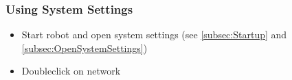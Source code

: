 \documentclass{article}
\begin{document}
\subsubsection{Using System Settings}
\begin{itemize}
\item Start robot and open system settings (see \ref{subsec:Startup} and \ref{subsec:OpenSystemSettings})
\begin{center}
\end{center}
\item Doubleclick on network


\end{itemize}
\end{document}
